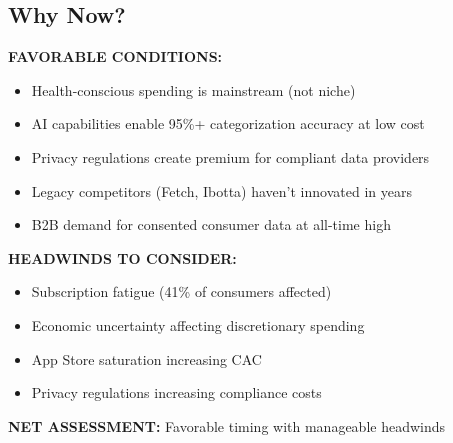\documentclass[11pt,a4paper]{article}
\begin{document}
\subsection{Why Now?}

\begin{highlightbox}[title=Market Timing Assessment]
\textbf{\textcolor{milogreen}{FAVORABLE CONDITIONS:}}
\begin{itemize}[leftmargin=15pt, itemsep=2pt]
    \item[\textcolor{milogreen}{\faIcon{check}}] Health-conscious spending is mainstream (not niche)
    \item[\textcolor{milogreen}{\faIcon{check}}] AI capabilities enable 95\%+ categorization accuracy at low cost
    \item[\textcolor{milogreen}{\faIcon{check}}] Privacy regulations create premium for compliant data providers
    \item[\textcolor{milogreen}{\faIcon{check}}] Legacy competitors (Fetch, Ibotta) haven't innovated in years
    \item[\textcolor{milogreen}{\faIcon{check}}] B2B demand for consented consumer data at all-time high
\end{itemize}

\vspace{10pt}
\textbf{\textcolor{milored}{HEADWINDS TO CONSIDER:}}
\begin{itemize}[leftmargin=15pt, itemsep=2pt]
    \item[\textcolor{milored}{\faIcon{times}}] Subscription fatigue (41\% of consumers affected)
    \item[\textcolor{milored}{\faIcon{times}}] Economic uncertainty affecting discretionary spending
    \item[\textcolor{milored}{\faIcon{times}}] App Store saturation increasing CAC
    \item[\textcolor{milored}{\faIcon{times}}] Privacy regulations increasing compliance costs
\end{itemize}

\vspace{10pt}
\textbf{\textcolor{milosecondary}{NET ASSESSMENT:}} Favorable timing with manageable headwinds
\end{highlightbox}

\newpage

\end{document}
